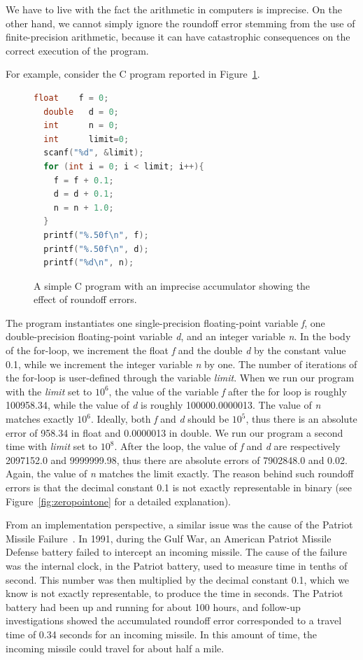 %
We have to live with the fact the arithmetic in computers is imprecise.
%
On the other hand, we cannot simply ignore the roundoff error stemming from the use of finite-precision arithmetic, because it can have catastrophic consequences on the correct execution of the program.
%

For example, consider the C program reported in Figure~\ref{fig:while}.
%
\begin{figure}[tb!]
	\begin{lstlisting}[frame=single, language=c]
  float    f = 0;
  double   d = 0;
  int      n = 0;
  int      limit=0;
  scanf("%d", &limit);
  for (int i = 0; i < limit; i++){
    f = f + 0.1;
    d = d + 0.1;
    n = n + 1.0;
  }
  printf("%.50f\n", f);
  printf("%.50f\n", d);
  printf("%d\n", n);
	\end{lstlisting}
	\caption{A simple C program with an imprecise accumulator showing the effect of roundoff errors.}\label{fig:while}
\end{figure}
%
The program instantiates one single-precision floating-point variable \emph{f}, one double-precision floating-point variable \emph{d}, and an integer variable \emph{n}.
%
In the body of the for-loop, we increment the float \emph{f} and the double \emph{d} by the constant value 0.1, while we increment the integer variable \emph{n} by one.
%
The number of iterations of the for-loop is user-defined through the variable \emph{limit}.
%
When we run our program with the \emph{limit} set to $10^6$, the value of the variable \emph{f} after the for loop is roughly 100958.34, while the value of \emph{d} is roughly 100000.0000013. The value of \emph{n} matches exactly $10^6$.
%
Ideally, both \emph{f} and \emph{d} should be $10^5$, thus there is an absolute error of 958.34 in float and 0.0000013 in double.
%
We run our program a second time with \emph{limit} set to $10^8$. 
%
After the loop, the value of \emph{f} and \emph{d} are respectively 2097152.0 and 9999999.98, thus there are absolute errors of 7902848.0 and 0.02. 
%
Again, the value of \emph{n} matches the limit exactly.
%
The reason behind such roundoff errors is that the decimal constant 0.1 is not exactly representable in binary (see Figure~\ref{fig:zeropointone} for a detailed explanation). 

%
From an implementation perspective, a similar issue was the cause of the Patriot Missile Failure~\cite{patriot}.
%
In 1991, during the Gulf War, an American Patriot Missile Defense battery failed to intercept an incoming missile.
%
The cause of the failure was the internal clock, in the Patriot battery, used to measure time in tenths of second.
%
This number was then multiplied by the decimal constant 0.1, which we know is not exactly representable, to produce the time in seconds.
%
The Patriot battery had been up and running for about 100 hours, and follow-up investigations showed the accumulated roundoff error corresponded to a travel time of 0.34 seconds for an incoming missile. 
%
In this amount of time, the incoming missile could travel for about half a mile.
%

